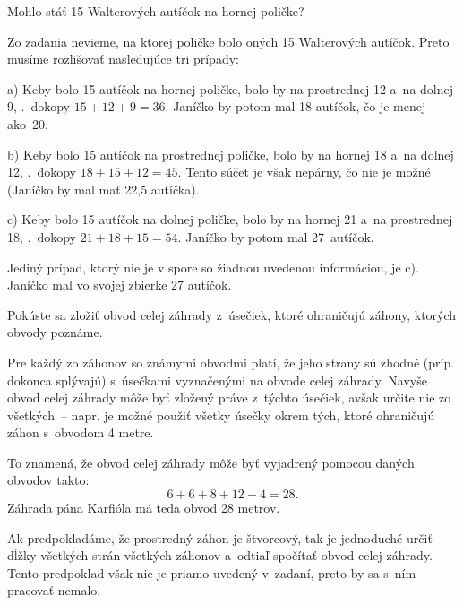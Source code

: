 {%
\napad
Mohlo stáť 15 Walterových autíčok na hornej poličke?

\res
Zo zadania nevieme, na ktorej poličke bolo oných 15 Walterových autíčok.
Preto musíme rozlišovať nasledujúce tri prípady:
\item{a)}
Keby bolo 15 autíčok na hornej poličke, bolo by na prostrednej 12 a~na dolnej
9, \tj.~dokopy $15+12+9=36$.
Janíčko by potom mal 18 autíčok, čo je menej ako~20.
\item{b)}
Keby bolo 15 autíčok na prostrednej poličke, bolo by na hornej 18 a~na dolnej
12, \tj.~dokopy $18+15+12=45$.
Tento súčet je však nepárny, čo nie je možné (Janíčko by mal mať 22{,}5 autíčka).
\item{c)}
Keby bolo 15 autíčok na dolnej poličke, bolo by na hornej 21 a~na prostrednej
18, \tj.~dokopy $21+18+15=54$.
Janíčko by potom mal 27~autíčok.

\noindent
Jediný prípad, ktorý nie je v spore so žiadnou uvedenou informáciou, je c).
Janíčko mal vo svojej zbierke 27 autíčok.
}

{%
\napad
Pokúste sa zložiť obvod celej záhrady z~úsečiek, ktoré ohraničujú záhony, ktorých obvody poznáme.

\riesenie
Pre každý zo záhonov so známymi obvodmi platí, že jeho strany
sú zhodné (príp. dokonca splývajú) s~úsečkami vyznačenými na obvode celej
záhrady.
Navyše obvod celej záhrady môže byť zložený práve z~týchto úsečiek, avšak určite
nie zo všetkých~-- napr. je možné použiť všetky úsečky okrem tých, ktoré
ohraničujú záhon s~obvodom 4 metre.
%

To znamená, že obvod celej záhrady môže byť vyjadrený pomocou daných obvodov
takto:
$$
6+6+8+12-4=28.
$$
Záhrada pána Karfióla má teda obvod 28 metrov.

\poznamka
Ak predpokladáme, že prostredný záhon je štvorcový, tak je jednoduché určiť
dĺžky všetkých strán všetkých záhonov a~odtiaľ spočítať obvod celej záhrady.
Tento predpoklad však nie je priamo uvedený v~zadaní, preto by sa s~ním pracovať
nemalo.
}

